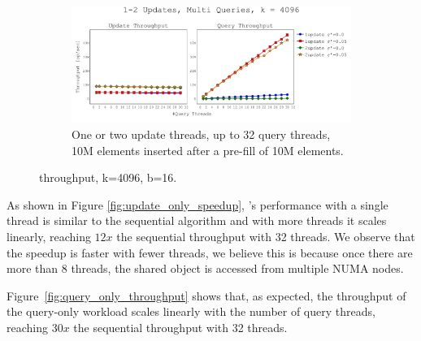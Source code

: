 \begin{figure}[h]
    \begin{subfigure}[]{\textwidth}
        \centering
        \includegraphics[width=\textwidth,trim={0cm 0cm 0cm 1cm},clip]
        {graphics/graphs/throughput/oracle_Quancurrent_blocking_numa_update_query_k_4096_b16_keys10M_pre10M_preT1_runs15_Tu1-2_Tq2-30_snapshot1_rho_1_0-05_united_16-08-2022_07-09-08.pdf}
        \caption{One or two update threads, up to 32 query threads, 10M elements inserted after a pre-fill of 10M elements.}
        \label{fig:mixed_throughput}
    \end{subfigure}
    \caption{\mysketch throughput, k=4096, b=16.}
    \label{fig:throughput}
\end{figure}


As shown in Figure \ref{fig:update_only_speedup}, \mysketch's performance with a single thread is similar to the sequential algorithm and with more threads it scales linearly, reaching $12x$ the sequential throughput with 32 threads. 
We observe that the speedup is faster with fewer threads, we believe this is because once there are more than $8$ threads, the shared object is accessed from multiple NUMA nodes.


Figure~\ref{fig:query_only_throughput} shows that, as expected, the throughput of the query-only workload scales linearly with the number of query threads, reaching $30x$ the sequential throughput with 32 threads.


